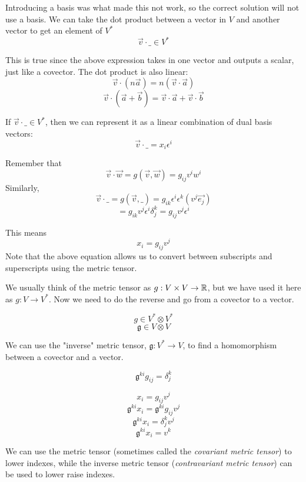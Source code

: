 \documentclass{report}
\begin{document}
Introducing a basis was what made this not work, so the correct solution will not use a basis. We can take the dot product between a vector in $V$ and another vector to get an element of $V^*$
$$ \vec{v} \cdot \_ \in V^*$$ 

This is true since the above expression takes in one vector and outputs a scalar, just like a covector. The dot product is also linear:
$$ \vec{v} \cdot \left( n \vec{a} \right) = n (\vec{v}\cdot \vec{a}) $$ 
$$ \vec{v}\cdot \left( \vec{a} + \vec{b} \right)  = \vec{v} \cdot \vec{a} + \vec{v} \cdot \vec{b}$$ 

If $\vec{v} \cdot \_\in V^*$, then we can represent it as a linear combination of dual basis vectors:
$$ \vec{v} \cdot \_ = x_i \epsilon^i $$ 

Remember that 
$$ \vec{v}\cdot \vec{w} = g(\vec{v}, \vec{w}) = g_{ij}v^i w^i $$ 
Similarly,
$$ \vec{v}\cdot \_ = g(\vec{v}, \_) = g_{ik} \epsilon^i\epsilon^k\left( v^j \vec{e_j} \right) $$ 
$$ = g_{ik} v^j \epsilon^i \delta_j^k = g_{ij} v^j \epsilon^i $$ 

This means
$$ x_i = g_{ij} v^j $$ 
Note that the above equation allows us to convert between subscripts and superscripts using the metric tensor.

We usually think of the metric tensor as $g: V\times V \to \R$, but we have used it here as $g: V\to V^*$. Now we need to do the reverse and go from a covector to a vector. 

 $$ g \in V^* \otimes V^* $$ 
 $$ \mathfrak{g} \in V \otimes V $$ 

 We can use the "inverse" metric tensor, $\mathfrak{g}: V^* \to V$, to find a homomorphism between a covector and a vector.

 $$ \mathfrak{g}^{ki} g_{ij}  = \delta_{j}^{k}$$  

 $$ x_i  = g_{ij}v^j $$ 
 $$ \mathfrak{g}^{ki}x_i = \mathfrak{g}^{ki} g_{ij}v^j $$ 
 $$ \mathfrak{g}^{ki}x_i = \delta_j^k v^j $$ 
 $$ \mathfrak{g}^{ki} x_i = v^k $$ 

 We can use the metric tensor (sometimes called the \emph{covariant metric tensor}) to lower indexes, while the inverse metric tensor (\emph{contravariant metric tensor}) can be used to lower raise indexes.
\end{document}

